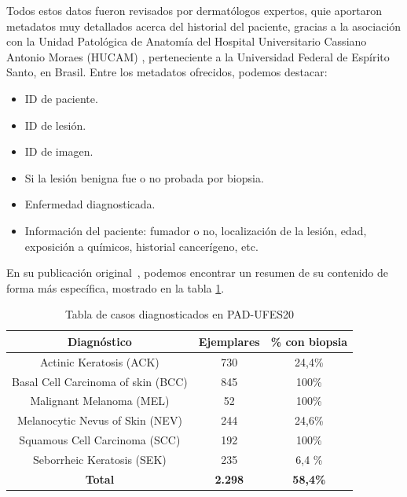 Todos estos datos fueron revisados por dermatólogos expertos, quie aportaron metadatos muy detallados acerca del historial del paciente, gracias a la asociación con la Unidad Patológica de Anatomía del Hospital Universitario Cassiano Antonio Moraes (HUCAM) , perteneciente a la Universidad Federal de Espírito Santo, en Brasil. Entre los metadatos ofrecidos, podemos destacar:

\begin{itemize}
	\item ID de paciente.
	\item ID de lesión.
	\item ID de imagen.
	\item Si la lesión benigna fue o no probada por biopsia.
	\item Enfermedad diagnosticada.
	\item Información del paciente: fumador o no, localización de la lesión, edad, exposición a químicos, historial cancerígeno, etc.
\end{itemize}

En su publicación original~\cite{PACHECO2020106221}, podemos encontrar un resumen de su contenido de forma más específica, mostrado en la tabla \ref{tab:casospadufes}.

\begin{table}[!ht]
	\centering
	\begin{tabular}{|c|c|c|}
		\hline
		\textbf{Diagnóstico} & \textbf{Ejemplares} & \textbf{\% con biopsia} \\ \hline
		Actinic Keratosis (ACK) & 730 & 24,4\% \\ \hline
		Basal Cell Carcinoma of skin (BCC) & 845 & 100\% \\ \hline
		Malignant Melanoma (MEL) & 52 & 100\% \\ \hline
		Melanocytic Nevus of Skin (NEV) & 244 & 24,6\% \\ \hline
		Squamous Cell Carcinoma (SCC) & 192 & 100\% \\ \hline
		Seborrheic Keratosis (SEK)	&235	&6,4 \% \\ \hline
		\textbf{Total} & \textbf{2.298} & \textbf{58,4\%} \\ \hline
	\end{tabular}
	\caption{Tabla de casos diagnosticados en PAD-UFES20}
	\label{tab:casospadufes}
\end{table}

